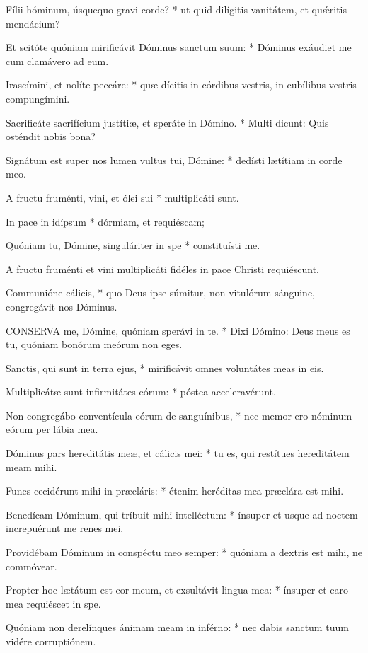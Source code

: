Fílii hóminum, úsquequo gravi corde? * ut quid dilígitis vanitátem, et quǽritis mendácium?

Et scitóte quóniam mirificávit Dóminus sanctum suum: * Dóminus exáudiet me cum clamávero ad eum.

Irascímini, et nolíte peccáre: * quæ dícitis in córdibus vestris, in cubílibus vestris compungímini.

Sacrificáte sacrifícium justítiæ, et speráte in Dómino. * Multi dicunt: Quis osténdit nobis bona?

Signátum est super nos lumen vultus tui, Dómine: * dedísti lætítiam in corde meo.

A fructu fruménti, vini, et ólei sui * multiplicáti sunt.

In pace in idípsum * dórmiam, et requiéscam;

Quóniam tu, Dómine, singuláriter in spe * constituísti me.

 A fructu fruménti et vini multiplicáti fidéles in pace Christi requiéscunt.

 Communióne cálicis, * quo Deus ipse súmitur, non vitulórum sánguine, congregávit nos Dóminus.


\lettrine[lines=2]{C}{ONSERVA} me, Dómine, quóniam sperávi in te. * Dixi Dómino: Deus meus es tu, quóniam bonórum meórum non eges.

Sanctis, qui sunt in terra ejus, * mirificávit omnes voluntátes meas in eis.

Multiplicátæ sunt infirmitátes eórum: * póstea acceleravérunt.

Non congregábo conventícula eórum de sanguínibus, * nec memor ero nóminum eórum per lábia mea.

Dóminus pars hereditátis meæ, et cálicis mei: * tu es, qui restítues hereditátem meam mihi.

Funes cecidérunt mihi in præcláris: * étenim heréditas mea præclára est mihi.

Benedícam Dóminum, qui tríbuit mihi intelléctum: * ínsuper et usque ad noctem increpuérunt me renes mei.

Providébam Dóminum in conspéctu meo semper: * quóniam a dextris est mihi, ne commóvear.

Propter hoc lætátum est cor meum, et exsultávit lingua mea: * ínsuper et caro mea requiéscet in spe.

Quóniam non derelínques ánimam meam in inférno: * nec dabis sanctum tuum vidére corruptiónem.

